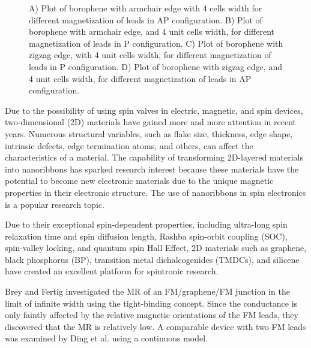 \documentclass[twoside,twocolumn,9pt]{article}
\begin{document}
\begin{figure*}[ht]
    \centering
    \resizebox{0.45\textwidth}{!}{}
    \resizebox{0.45\textwidth}{!}{}
    \resizebox{0.45\textwidth}{!}{}
    \resizebox{0.45\textwidth}{!}{}
    \caption{A) Plot of borophene with armchair edge with 4 cells width for different magnetization of leads in AP configuration. B) Plot of borophene with armchair edge, and 4 unit cells width, for different magnetization of leads in P configuration. C) Plot of borophene with zigzag edge, with 4 unit cells width, for different magnetization of leads in P configuration. D) Plot of borophene with zigzag edge, and 4 unit cells width, for different magnetization of leads in AP configuration.}
    \label{fig:conductance}
\end{figure*}

Due to the possibility of using spin valves in electric, magnetic, and spin devices, two-dimensional (2D) materials have gained more and more attention in recent years\cite{gupta2015recent,an2019unveiling,mu2019electronic,an2020evaluating}. Numerous structural variables, such as flake size, thickness, edge shape, intrinsic defects, edge termination atoms, and others\cite{an2019unveiling,bekaroglu2010first,sun2008electronic,zhao2017spin}, can affect the characteristics of a material. The capability of transforming 2D-layered materials into nanoribbons has sparked research interest because these materials have the potential to become new electronic materials due to the unique magnetic properties in their electronic structure. The use of nanoribbons in spin electronics is a popular research topic.

Due to their exceptional spin-dependent properties, including ultra-long spin relaxation time and spin diffusion length, Rashba spin-orbit coupling (SOC), spin-valley locking, and quantum spin Hall Effect, 2D materials such as graphene\cite{novoselov2004electric}, black phosphorus (BP)\cite{liu2014phosphorene}, transition metal dichalcogenides (TMDCs)\cite{wang2012electronics}, and silicene\cite{guzman2007electronic} have created an excellent platform for spintronic research\cite{rahmani2019quantum,rahmani2020effect,davoodianidalik2018electronic,davoodianidalik2019structural}.

Brey and Fertig\cite{brey2007electronic} investigated the MR of an FM/graphene/FM junction in the limit of infinite width using the tight-binding concept. Since the conductance is only faintly affected by the relative magnetic orientations of the FM leads, they discovered that the MR is relatively low. A comparable device with two FM leads was examined by Ding et al.\cite{ding2009magnetic} using a continuous model.
\end{document}
